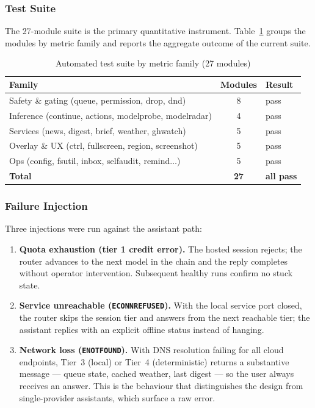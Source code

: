 \documentclass[conference]{IEEEtran}
\begin{document}
\subsubsection{Test Suite}

The 27-module suite is the primary quantitative instrument.
Table~\ref{tab:tests} groups the modules by metric family and
reports the aggregate outcome of the current suite.

\begin{table}[t]
\centering\small
\caption{Automated test suite by metric family (27 modules)}
\label{tab:tests}
\begin{tabular}{@{}p{}c@{\qquad}p{}@{}}
\toprule
\textbf{Family} & \textbf{Modules} & \textbf{Result} \\
\midrule
Safety \& gating (queue, permission, drop, dnd) & 8 & pass \\
Inference (continue, actions, modelprobe, modelradar) & 4 & pass \\
Services (news, digest, brief, weather, ghwatch) & 5 & pass \\
Overlay \& UX (ctrl, fullscreen, region, screenshot) & 5 & pass \\
Ops (config, fsutil, inbox, selfaudit, remind$\ldots$) & 5 & pass \\
\midrule
\textbf{Total} & \textbf{27} & \textbf{all pass} \\
\bottomrule
\end{tabular}
\end{table}

\subsubsection{Failure Injection}

Three injections were run against the assistant path:

\begin{enumerate}
  \item \textbf{Quota exhaustion (tier 1 credit error).} The
  hosted session rejects; the router advances to the next model
  in the chain and the reply completes without operator
  intervention. Subsequent healthy runs confirm no stuck state.
  \item \textbf{Service unreachable (\texttt{ECONNREFUSED}).}
  With the local service port closed, the router skips the
  session tier and answers from the next reachable tier; the
  assistant replies with an explicit offline status instead of
  hanging.
  \item \textbf{Network loss (\texttt{ENOTFOUND}).} With DNS
  resolution failing for all cloud endpoints, Tier~3 (local) or
  Tier~4 (deterministic) returns a substantive message ---
  queue state, cached weather, last digest --- so the user
  always receives an answer. This is the behaviour that
  distinguishes the design from single-provider assistants,
  which surface a raw error.
\end{enumerate}
\end{document}
